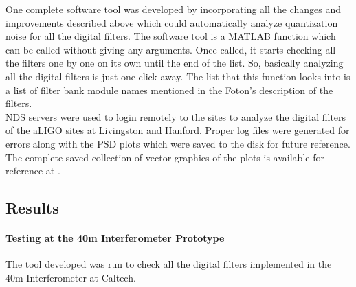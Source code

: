 \documentclass[a4paper,12pt]{article}
\begin{document}
	One complete software tool was developed by incorporating all the changes and improvements described above which could automatically analyze quantization noise for all the digital filters. The software tool is a MATLAB function which can be called without giving any arguments. Once called, it starts checking all the filters one by one on its own until the end of the list. So, basically analyzing all the digital filters is just one click away. The list that this function looks into is a list of filter bank module names mentioned in the Foton's description of the filters. \\
	NDS servers were used to login remotely to the sites to analyze the digital filters of the aLIGO sites at Livingston and Hanford. Proper log files were generated for errors along with the PSD plots which were saved to the disk for future reference. The complete saved collection of vector graphics of the plots is available for reference at \cite{Collection}.  \\
	
	\subsection{Results}
		\paragraph{Testing at the 40m Interferometer Prototype}
	The tool developed was run to check all the digital filters implemented in the 40m Interferometer at Caltech.
\end{document}
